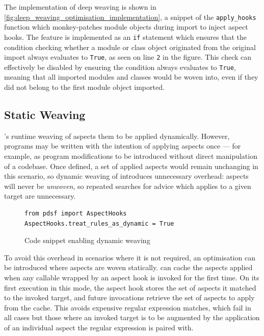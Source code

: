 The implementation of deep weaving is shown in
\cref{fig:deep_weaving_optimisation_implementation}, a snippet of the
\lstinline{apply_hooks} function which monkey-patches module objects during
import to inject aspect hooks. The feature is implemented as an \lstinline{if}
statement which ensures that the condition checking whether a module or class
object originated from the original import always evaluates to \lstinline{True}, as seen
on line \texttt{2} in the figure. This check can effectively be disabled by
ensuring the condition always evaluates to \lstinline{True}, meaning that all
imported modules and classes would be woven into, even if they did not belong to
the first module object imported.


\subsection{Static Weaving}
\label{static_weaving}

\pdsf{}'s runtime weaving of aspects them to be applied dynamically. However,
programs may be written with the intention of applying aspects once --- for
example, as program modifications to be introduced without direct manipulation
of a codebase. Once defined, a set of applied aspects would remain unchanging in
this scenario, so dynamic weaving of \pdsf introduces unnecessary overhead:
aspects will never be \emph{unwoven}, so repeated searches for advice which
applies to a given target are unnecessary. 

\begin{figure}[h]
    \begin{lstlisting}[style=footnotesize_python]
from pdsf import AspectHooks
AspectHooks.treat_rules_as_dynamic = True
    \end{lstlisting}
    \caption{Code snippet enabling dynamic weaving}
    \label{fig:enabling_dynamic_weaving}
\end{figure}

To avoid this overhead in scenarios where it is not required, an optimisation
can be introduced where aspects are woven statically. \pdsf can cache the
aspects applied when any callable wrapped by an aspect hook is invoked for the
first time. On its first execution in this mode, the aspect hook stores the set
of aspects it matched to the invoked target, and future invocations retrieve the
set of aspects to apply from the cache. This avoids expensive regular expression
matches,
which fail in all cases but those where an invoked target is to be augmented by
the application of an individual aspect the regular expression is paired
with.


